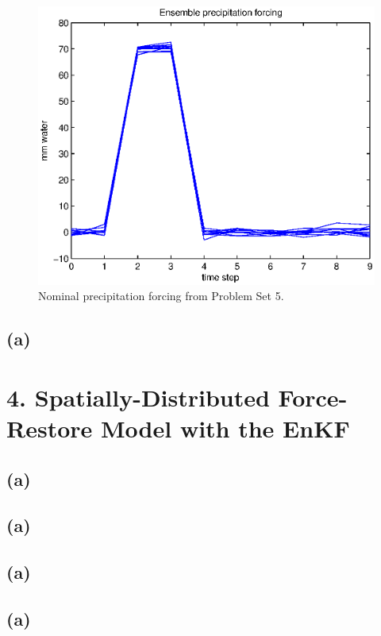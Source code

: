 \documentclass[letterpaper]{tufte-handout}
\begin{document}
    \begin{figure}
      \includegraphics[width=\textwidth]{1b}
      \caption{Nominal precipitation forcing from Problem Set 5.}
      \label{1b}
    \end{figure}
\subsection{(a)}
\section{4. Spatially-Distributed Force-Restore Model with the EnKF}
\subsection{(a)}
\subsection{(a)}
\subsection{(a)}
\subsection{(a)}
\end{document}
